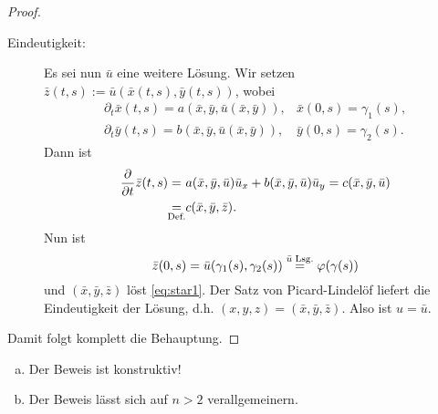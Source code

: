 \begin{proof}
\begin{description}
       \item[Eindeutigkeit:] Es sei nun $\bar u$ eine weitere Lösung. Wir setzen $\bar z(t,s):=\bar u(\bar x(t,s),\bar y(t,s))$, wobei
    \begin{eqnarray*}
      \partial_t\bar x(t,s)=a(\bar x,\bar y,\bar u(\bar x,\bar y)), &
      \bar x(0,s)=\gamma_1(s), \\
      \partial_t\bar y(t,s)=b(\bar x,\bar y,\bar u(\bar x,\bar y)), &
      \bar y(0,s)=\gamma_2(s).
    \end{eqnarray*}
Dann ist
    \begin{align*}
      \frac{\partial}{\partial t} \bar z(t,s) = \ & a(\bar x,\bar y,\bar u)\bar u_x
      + b(\bar x,\bar y,\bar u)\bar u_y = c(\bar x,\bar y,\bar u) \\
      \underset{\scriptsize\text{Def.}}=&c(\bar x,\bar y,\bar z).
    \end{align*}
Nun ist
\[
\bar z(0,s)=\bar u(\gamma_1(s),\gamma_2(s))\overset{\bar u\; \scriptsize\text{Lsg.}}=\varphi(\gamma(s))
\]
und  $(\bar x,\bar y,\bar z)$ löst \eqref{eq:star1}. Der Satz von Picard-Lindelöf liefert die Eindeutigkeit der Lösung, d.h. $(x,y,z)=(\bar x,\bar y,\bar z)$. Also ist $u=\bar u$.
  \end{description}
  
  Damit folgt komplett die Behauptung.
\end{proof}

\begin{bem}
  \begin{enumerate}[(a)]
  \item Der Beweis ist konstruktiv!
  \item Der Beweis lässt sich auf $n>2$ verallgemeinern.
  \end{enumerate}
\end{bem}

